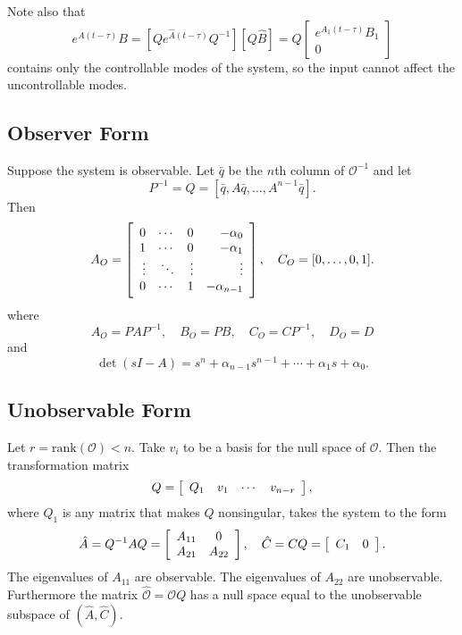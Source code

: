 \documentclass{report}
\begin{document}
Note also that
$$
e^{A(t - \tau)} B
= [ Q e^{\hat{A}(t - \tau)} Q^{-1} ]
  [ Q \hat{B} ]
= Q\left[\begin{array}{c}
     e^{A_1 (t - \tau)} B_1 \\
     0
   \end{array}\right]
$$
contains only the controllable modes of the system, so the input
cannot affect the uncontrollable modes.

\subsection{Observer Form}
Suppose the system is observable.
Let $\bar{q}$ be the $n$th column of $\mathcal{O}^{-1}$ and let
$$
P^{-1} = Q = [\bar{q}, A \bar{q}, \dots, A^{n-1} \bar{q}].
$$
Then
$$
A_O =
\left[\begin{array}{r r r r}
  0      & \cdots & 0      & -\alpha_0 \\
  1      & \cdots & 0      & -\alpha_1 \\
  \vdots & \ddots & \vdots & \vdots    \\
  0      & \cdots & 1      & -\alpha_{n-1}
\end{array}\right], \quad
C_O = [0, \dots, 0, 1].
$$
where
$$
A_O = P A P^{-1}, \quad
B_O = P B, \quad
C_O = C P^{-1}, \quad
D_O = D
$$
and
$$
\det (sI - A) = s^n + \alpha_{n-1} s^{n-1} + \cdots + \alpha_1 s + \alpha_0.
$$

\subsection{Unobservable Form}
Let $r = \mathrm{rank}(\mathcal{O}) < n$. Take
$v_i$ to be a basis for the null space of $\mathcal{O}$. Then the
transformation matrix
$$
Q =
\left[\begin{array}{c c c c }
  Q_1 & v_1 & \cdots & v_{n-r}
\end{array}\right],
$$
where $Q_1$ is any matrix that makes $Q$ nonsingular, takes the system
to the form
$$
\hat{A} = Q^{-1} A Q =
\left[\begin{array}{c c}
  A_{11} & 0      \\
  A_{21} & A_{22}
\end{array}\right], \quad
\hat{C} = C Q =
\left[\begin{array}{c c}
  C_1 & 0
\end{array}\right].
$$
The eigenvalues of $A_{11}$ are observable. The eigenvalues of
$A_{22}$ are unobservable.
Furthermore the matrix $\hat{\mathcal{O}} = \mathcal{O} Q$ has a null
space equal to the unobservable subspace of $(\hat{A}, \hat{C})$.
\end{document}
